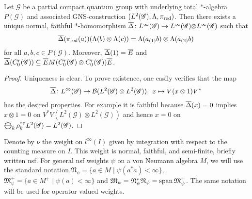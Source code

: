 \begin{Prop} \label{prop:vn-delta} Let $\mathscr{G}$ be a partial
  compact quantum group with underlying total $*$-algebra
  $P(\mathscr{G})$ and associated GNS-construction
  $(L^{2}(\mathscr{G}),\Lambda,\pi_{\operatorname{\mathrm{red}}})$. Then there
  exists a unique normal, faithful $*$-homomorphism $\overline{\Delta} \colon
  L^{\infty}(\mathscr{G}) \to L^{\infty}(\mathscr{G}) \bar{\otimes} L^{\infty}(\mathscr{G})$ such that
  \begin{align*}
    \overline{\Delta}(\pi_{\operatorname{\mathrm{red}}}(a)) (\Lambda(b) \otimes \Lambda(c)) =
    \Lambda(a_{(1)}b) \otimes \Lambda(a_{(2)}b) 
  \end{align*}
  for all $a,b,c \in P(\mathscr{G})$. Moreover, $\overline{\Delta}(1)=\overline{E}$ and
  $\overline{\Delta}(C^{r}_{0}(\mathscr{G})) \subseteq \overline{E} M(C^{r}_{0}(\mathscr{G}) \otimes
  C^{r}_{0}(\mathscr{G}))\overline{E}$.
\end{Prop}
\begin{proof}
  Uniqueness is clear. To prove existence, one easily verifies that
  the map
  \begin{align*}
 \overline{\Delta} \colon L^{\infty}(\mathscr{G}) \to {\cal B}(L^{2}(\mathscr{G}) \otimes L^{2}(\mathscr{G})), \ x
  \mapsto V(x \otimes 1)V^{*}   
  \end{align*}
  has the desired properties. For example it is faithful because
  $\overline{\Delta}(x)=0$ implies $x\otimes 1=0$ on $V^{*}V(L^{2}(\mathscr{G})
  \otimes L^{2}(\mathscr{G}))$ and hence $x=0$ on $\bigoplus_{k}
  \rho_{k}^{\operatorname{\mathrm{op}}}L^{2}(\mathscr{G})=L^{2}(\mathscr{G})$.
\end{proof}

Denote by $\nu$ the weight on $l^{\infty}(I)$ given by
integration with respect to the counting measure on $I$. This weight is
normal, faithful, and semi-finite,  briefly written nsf. For general nsf weights $\psi$ on a von Neumann algebra $M$, we will use the standard notation $\mathfrak{N}_{\psi} = \{a\in M\mid \psi(a^*a)<\infty\}$, $\mathfrak{M}_{\psi}^+  = \{a\in M^+\mid\psi(a)<\infty\}$ and $\mathfrak{M}_{\psi} = \mathfrak{N}_{\psi}^*\mathfrak{N}_{\psi} = \operatorname{\mathrm{span}} \mathfrak{M}_{\psi}^+$. The same notation will be used for operator valued weights.

